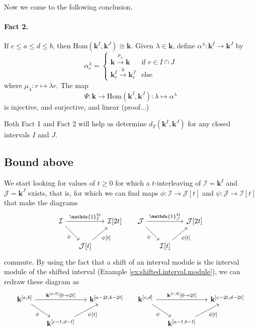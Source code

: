 \documentclass[11pt]{article}
\begin{document}
Now we come to the following conclusion.

\paragraph{Fact 2.} If  \(c\leq a\leq d\leq b\), 
then   $\mathrm{Hom}(\mathbf{k}^I, \mathbf{k}^J)\cong \mathbf{k} $.
Given \(\lambda\in \mathbf{k}\),
define $\alpha^\lambda \colon \mathbf{k}^I\to \mathbf{k}^J  $ 
by 
$$
\alpha^\lambda_r =
\begin{cases}
\mathbf{k}\xrightarrow{\mu_\lambda}\mathbf{k}
&\text{if } r\in I\cap J\\
\mathbf{k}^I_r\xrightarrow{0}\mathbf{k}^J_r&\text{else}
\end{cases}
$$
where \(\mu_\lambda\colon r\mapsto \lambda r\).
The map $$\Psi \colon \mathbf{k}\to \mathrm{Hom}(\mathbf{k}^I, \mathbf{k}^J):\lambda\mapsto \alpha^\lambda$$
is injective, and 
surjective, and linear
(proof...)
\bigskip

Both Fact 1 and Fact 2 will help us determine \(d_T(\mathbf{k}^I, \mathbf{k}^J)\)
for any closed intervals \(I\) and \(J\).
\subsection{Bound above}

We start looking for values of \(t\geq 0\) 
for which a \(t\)-interleaving of 
\({\mathcal{I}}=\mathbf{k}^I\) and \({\mathcal{J}}=\mathbf{k}^J\)
exists, that is,
for which we can find maps 
$ \phi\colon {\mathcal{I}}\to {\mathcal{J}}[t]$ and $ \psi\colon {\mathcal{J}}\to {\mathcal{I}}[t]   $ 
that make the diagrams
$$
\begin{tikzcd}[column sep={1.4em}]
{\mathcal{I}} \arrow[rd, "\phi"'] \arrow[rr, "\mathds{1}^{2t}_{{\mathcal{I}}}"] &                                 & {{\mathcal{I}}[2t]} & {\mathcal{J}} \arrow[rd, "\psi"'] \arrow[rr, "\mathds{1}^{2t}_{{\mathcal{J}}}"] &                                 & {{\mathcal{J}}[2t]} \\
                                                      & {{\mathcal{J}}[t]} \arrow[ru, "{\psi[t]}"'] &         &                                                       & {{\mathcal{I}}[t]} \arrow[ru, "{\phi[t]}"'] &        
\end{tikzcd}
$$
commute.
By using the fact that a shift of an interval module is 
the interval module of the shifted interval (Example \ref{ex:shifted.interval.module}),
we can redraw these diagram as 
%
$$
\begin{tikzcd}[column sep=1.25em]
{\mathbf{k}^{[a,b]}} \arrow[rd, "\phi"'] \arrow[rr, "{{\mathbf{k}^{[a,b]}[0\to 2t]}}"] &                                 & {{\mathbf{k}^{[a-2t,b-2t]}}} & {\mathbf{k}^{[c,d]}} \arrow[rd, "\psi"'] \arrow[rr, "{{\mathbf{k}^{[c,d]}[0\to 2t]}}"] &                                 & {{\mathbf{k}^{[c-2t,d-2t]}}} \\
                                                      & {{\mathbf{k}^{[c-t,d-t]}}} \arrow[ru, "{\psi[t]}"'] &         &                                                       & {{\mathbf{k}^{[a-t,b-t]}}} \arrow[ru, "{\phi[t]}"'] &        
\end{tikzcd}
$$
\end{document}
